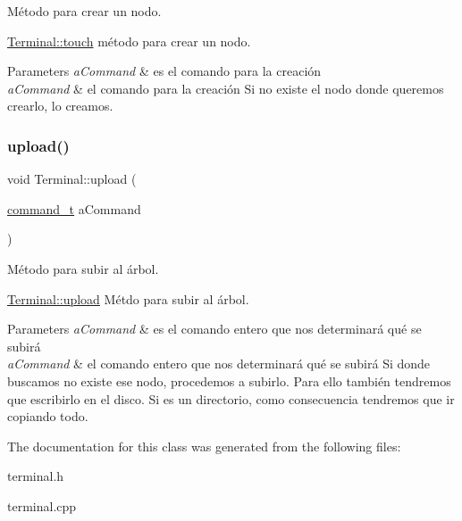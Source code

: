 Método para crear un nodo. 

\hyperlink{classTerminal_a8b0df976ff03c2dfd4cc36a99cad54e2}{Terminal\+::touch} método para crear un nodo.


\begin{DoxyParams}{Parameters}
{\em a\+Command} & es el comando para la creación\\
\hline
{\em a\+Command} & el comando para la creación Si no existe el nodo donde queremos crearlo, lo creamos. \\
\hline
\end{DoxyParams}
\mbox{\label{classTerminal_ac604ed511dcda771e720d9d746bb76d5}} 
\subsubsection{\texorpdfstring{upload()}{upload()}}
{\footnotesize\ttfamily void Terminal\+::upload (\begin{DoxyParamCaption}\item[{\hyperlink{structcommand__t}{command\+\_\+t}}]{a\+Command }\end{DoxyParamCaption})}



Método para subir al árbol. 

\hyperlink{classTerminal_ac604ed511dcda771e720d9d746bb76d5}{Terminal\+::upload} Métdo para subir al árbol.


\begin{DoxyParams}{Parameters}
{\em a\+Command} & es el comando entero que nos determinará qué se subirá\\
\hline
{\em a\+Command} & el comando entero que nos determinará qué se subirá Si donde buscamos no existe ese nodo, procedemos a subirlo. Para ello también tendremos que escribirlo en el disco. Si es un directorio, como consecuencia tendremos que ir copiando todo. \\
\hline
\end{DoxyParams}


The documentation for this class was generated from the following files\+:\begin{DoxyCompactItemize}
\item 
terminal.\+h\item 
terminal.\+cpp\end{DoxyCompactItemize}
